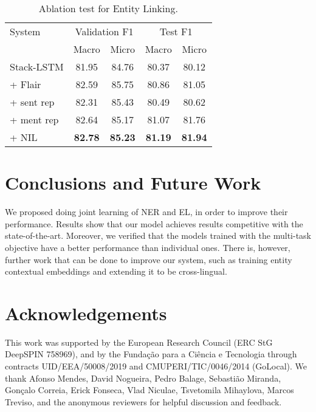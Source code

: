 \documentclass[11pt,a4paper,dvipsnames]{article}
\begin{document}
{

\renewcommand{\arraystretch}{1.2}
\begin{table}[h!]
\begin{centering}\small
\begin{tabular}{lcccc}
\hline 
System &  \multicolumn{2}{c}{Validation F1} & \multicolumn{2}{c}{Test F1} \tabularnewline
& Macro & Micro & Macro & Micro \\
\hline 
Stack-LSTM                & 81.95 & 84.76 & 80.37 & 80.12 \tabularnewline
+ Flair                   & 82.59 & 85.75 & 80.86 & 81.05 \tabularnewline
+ sent rep                & 82.31 & 85.43 & 80.49 & 80.62 \tabularnewline
+ ment rep                & 82.64 & 85.17 & 81.07 & 81.76 \tabularnewline
+ NIL                     & \textbf{82.78} & \textbf{85.23} & \textbf{81.19} & \textbf{81.94}\tabularnewline
\hline 
\end{tabular}
\par\end{centering}
\centering{}
\caption{Ablation test for Entity Linking.}
\label{ablel}
\end{table}
}

\section{Conclusions and Future Work}
We proposed doing joint learning of NER and EL, in order to improve their performance. Results show that our model achieves results competitive with the state-of-the-art. Moreover, we verified that the models trained with the multi-task objective have a better performance than individual ones.
There is, however, further work that can be done to improve our system, such as training entity contextual embeddings and extending it to be cross-lingual.  

\section*{Acknowledgements}
This work was
supported by the European Research Council (ERC StG DeepSPIN 758969),
and by the Funda\c{c}\~ao para a Ci\^encia e Tecnologia
through contracts UID/EEA/50008/2019 and CMUPERI/TIC/0046/2014 (GoLocal). We thank Afonso Mendes, David Nogueira, Pedro Balage, Sebasti\~ao Miranda, Gon\c{c}alo Correia, Erick Fonseca, Vlad Niculae, Tsvetomila Mihaylova, Marcos Treviso, and the anonymous reviewers for helpful discussion and feedback.



\end{document}
